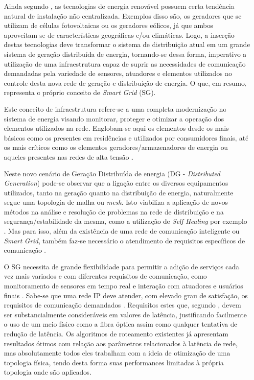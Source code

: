 \documentclass[12pt]{article}
\begin{document}
Ainda segundo \cite{Art_Gungor2013}, as tecnologias de energia renovável possuem certa tendência natural de instalação não centralizada. Exemplos disso são, os geradores que se utilizam de células fotovoltaicas ou os geradores eólicos, já que ambos aproveitam-se de características geográficas e/ou climáticas. Logo, a inserção destas tecnologias deve transformar o sistema de distribuição atual em um grande sistema de geração distribuída de energia, tornando-se dessa forma, imperativo a utilização de uma infraestrutura capaz de suprir as necessidades de comunicação demandadas pela variedade de sensores, atuadores e elementos utilizados no controle desta nova rede de geração e distribuição de energia. O que, em resumo, representa o próprio conceito de \emph{Smart Grid} (SG).

Este conceito de infraestrutura refere-se a uma completa modernização no sistema de energia visando monitorar, proteger e otimizar a operação dos elementos utilizados na rede. Englobam-se aqui os elementos desde os mais básicos como os presentes em residências e utilizados por consumidores finais, até os mais críticos como os elementos geradores/armazenadores de energia ou aqueles presentes nas redes de alta tensão \cite{Conf_Sood2009}.

Neste novo cenário de Geração Distribuída de energia (DG - \emph{Distributed Generation}) pode-se observar que a ligação entre os diversos equipamentos utilizados, tanto na geração quanto na distribuição de energia, naturalmente segue uma topologia de malha ou \emph{mesh}. Isto viabiliza a aplicação de novos métodos na análise e resolução de problemas na rede de distribuição e na segurança/estabilidade da mesma, como a utilização de \emph{Self Healing} por exemplo \cite{Art_Amin2006}. Mas para isso, além da existência de uma rede de comunicação inteligente ou \emph{Smart Grid}, também faz-se necessário o atendimento de requisitos específicos de comunicação \cite{Conf_Sood2009}.

O SG necessita de grande flexibilidade para permitir a adição de serviços cada vez mais variados e com diferentes requisitos de comunicação, como monitoramento de sensores em tempo real e interação com atuadores e usuários finais \cite{Art_Aggarwal2010}. Sabe-se que uma rede IP deve atender, com elevado grau de satisfação, os requisitos de comunicação demandados \cite{Conf_Lobo2008}. Requisitos estes que, segundo \cite{Art_Aggarwal2010}, devem ser substancialmente consideráveis em valores de latência, justificando facilmente o uso de um meio físico como a fibra óptica assim como qualquer tentativa de redução de latência. Os algoritmos de roteamento existentes já apresentam resultados ótimos com relação aos parâmetros relacionados à latência de rede, mas absolutamente todos eles trabalham com a ideia de otimização de uma topologia física, tendo desta forma suas performances limitadas à própria topologia onde são aplicados. 
\end{document}
